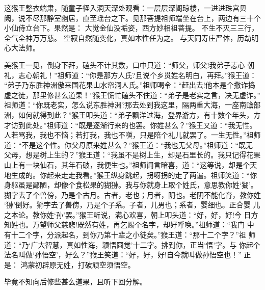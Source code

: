 这猴王整衣端肃，随童子径入洞天深处观看：一层层深阁琼楼，一进进珠宫贝
阙，说不尽那静室幽居，直至瑶台之下。见那菩提祖师端坐在台上，两边有三十个
小仙侍立台下。果然是：
大觉金仙没垢姿，西方妙相祖菩提。
不生不灭三三行，全气全神万万慈。
空寂自然随变化，真如本性任为之。
与天同寿庄严体，历劫明心大法师。

美猴王一见，倒身下拜，磕头不计其数，口中只道：“师父，师父!我弟子志心
朝礼，志心朝礼！”祖师道：“你是那方人氏?且说个乡贯姓名明白，再拜。”猴王道：
“弟子乃东胜神洲傲来国花果山水帘洞人氏。”祖师喝令：“赶出去!他本是个撒诈捣
虚之徒，那里修甚么道果！”猴王慌忙磕头不住道：“弟子是老实之言，决无虚诈。”
祖师道：“你既老实，怎么说东胜神洲?那去处到我这里，隔两重大海，一座南赡部
洲，如何就得到此？”猴王叩头道：“弟子飘洋过海，登界游方，有十数个年头，方
才访到此处。”祖师道：“既是逐渐行来的也罢。你姓甚么？”猴王又道：“我无性。
人若骂我，我也不恼；若打我，我也不嗔，只是陪个礼儿就罢了。一生无性。”祖师
道：“不是这个性。你父母原来姓甚么？”猴王道：“我也无父母。”祖师道：“既无
父母，想是树上生的？”猴王道：“我虽不是树上生，却是石里长的。我只记得花果
山上有一块仙石，其年石破，我便生也。”祖师闻言暗喜，道：“这等说，却是个天
地生成的。你起来走走我看。”猴王纵身跳起，拐呀拐的走了两遍。祖师笑道：“你
身躯虽是鄙陋，却像个食松果的猢狲。我与你就身上取个姓氏，意思教你姓‘猢’。
猢字去了个兽傍，乃是个古月。古者，老也；月者，阴也。老阴不能化育，教你姓
‘狲’倒好。狲字去了兽傍，乃是个子系。子者，儿男也；系者，婴细也。正合婴
儿之本论。教你姓‘孙’罢。”猴王听说，满心欢喜，朝上叩头道：“好，好，好!今
日方知姓也。万望师父慈悲!既然有姓，再乞赐个名字，却好呼唤。”祖师道：“我门
中有十二个字，分派起名，到你乃第十辈之小徒矣。”猴王道：“那十二个字？”祖
师道：“乃‘广大智慧，真如性海，颖悟圆觉’十二字。排到你，正当‘悟’字。与
你起个法名叫做‘孙悟空’，好么？”猴王笑道：“好，好，好!自今就叫做孙悟空也！”
正是：
鸿蒙初辟原无姓，打破顽空须悟空。

毕竟不知向后修些甚么道果，且听下回分解。